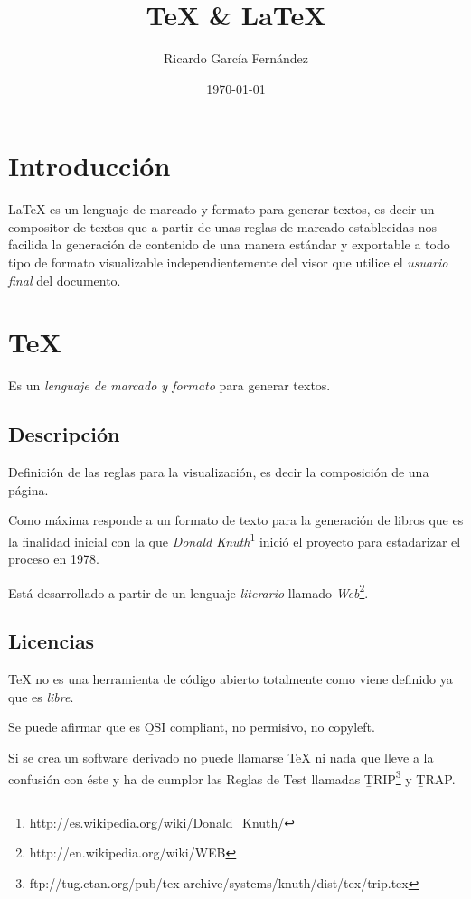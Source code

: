 \documentclass[11pt]{article}
\title{\textbf{\TeX{} \& \LaTeX{}}}
\author{Ricardo Garc\'ia Fern\'andez}
\date{\today}
\begin{document}
\maketitle

\section{Introducci\'on}

\LaTeX{} es un lenguaje de marcado y formato para generar textos, es decir un compositor de textos que a partir de unas reglas de marcado establecidas nos facilida la generaci\'on de contenido de una manera est\'andar y exportable a todo tipo de formato visualizable independientemente del visor que utilice el  \emph{usuario final} del documento.

\section{\TeX{}}

Es un \emph{lenguaje de marcado y formato} para generar textos.

\subsection{Descripci\'on}

Definici\'on de las reglas para la visualizaci\'on, es decir la composici\'on de una p\'agina.

Como m\'axima responde a un formato de texto para la generaci\'on de libros que es la finalidad inicial con la que \emph{Donald Knuth}\footnote{http://es.wikipedia.org/wiki/Donald\_Knuth/} inici\'o el proyecto para estadarizar el proceso en 1978.

Est\'a desarrollado a partir de un lenguaje \emph{literario} llamado \emph{Web}\footnote{http://en.wikipedia.org/wiki/WEB}.

\subsection{Licencias}

\TeX{} no es una herramienta de c\'odigo abierto totalmente como viene definido ya que es \emph{libre}.

Se puede afirmar que es \b{OSI compliant}, no permisivo, no copyleft.

Si se crea un software derivado no puede llamarse \TeX{} ni nada que lleve a la confusi\'on con \'este y ha de cumplor las Reglas de Test llamadas \b{TRIP}\footnote{ftp://tug.ctan.org/pub/tex-archive/systems/knuth/dist/tex/trip.tex} y \b{TRAP}.
\end{document}
